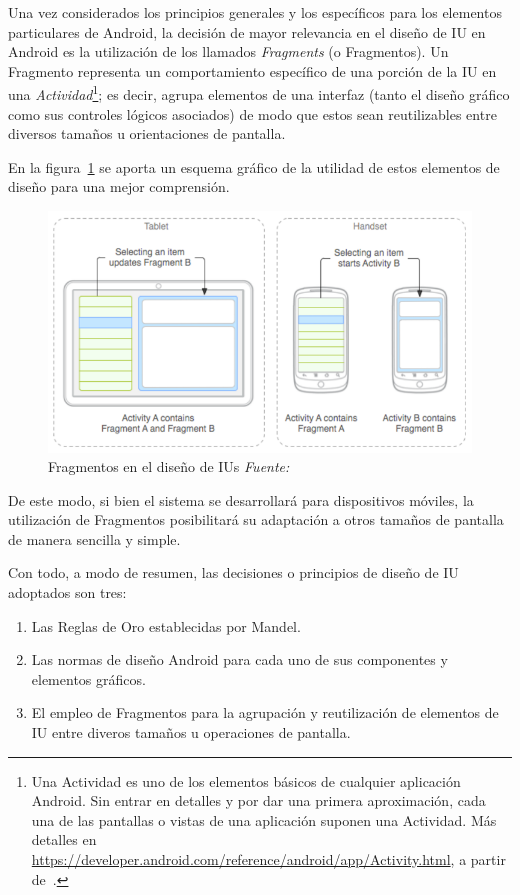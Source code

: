 Una vez considerados los principios generales y los específicos para los elementos particulares de Android, la decisión de mayor relevancia en el diseño de IU en Android es la utilización de los llamados \emph{Fragments} (o Fragmentos). Un Fragmento representa un comportamiento específico de una porción de la IU en una \emph{Actividad}\footnote{Una Actividad es uno de los elementos básicos de cualquier aplicación Android. Sin entrar en detalles y por dar una primera aproximación, cada una de las pantallas o vistas de una aplicación suponen una Actividad. Más detalles en \url{https://developer.android.com/reference/android/app/Activity.html}, a partir de~\cite{AnDev}.}; es decir, agrupa elementos de una interfaz (tanto el diseño gráfico como sus controles lógicos asociados) de modo que estos sean reutilizables entre diversos tamaños u orientaciones de pantalla.

En la figura~\ref{fig:fragmentsAndroid} se aporta un esquema gráfico de la utilidad de estos elementos de diseño para una mejor comprensión.

\begin{figure} [!htb]
	\centering
	\includegraphics[width=\linewidth,height=\textheight,keepaspectratio]{Images/FragmentsAndroid}
	\caption[Fragmentos en el diseño de IUs]{Fragmentos en el diseño de IUs \textit{Fuente:~\cite{AnDev}}}
	\label{fig:fragmentsAndroid}
\end{figure}

De este modo, si bien el sistema se desarrollará para dispositivos móviles, la utilización de Fragmentos posibilitará su adaptación a otros tamaños de pantalla de manera sencilla y simple.

Con todo, a modo de resumen, las decisiones o principios de diseño de IU adoptados son tres:

\begin{enumerate}
	\item{Las Reglas de Oro establecidas por Mandel}.
	\item{Las normas de diseño Android para cada uno de sus componentes y elementos gráficos}.
	\item{El empleo de Fragmentos para la agrupación y reutilización de elementos de IU entre diveros tamaños u operaciones de pantalla}.
\end{enumerate}

